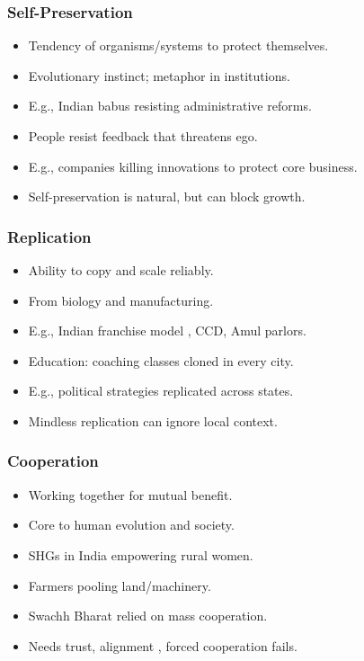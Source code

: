 \begin{frame}[fragile]\frametitle{Self-Preservation}
  \begin{itemize}
    \item Tendency of organisms/systems to protect themselves.
    \item Evolutionary instinct; metaphor in institutions.
    \item E.g., Indian babus resisting administrative reforms.
    \item People resist feedback that threatens ego.
    \item E.g., companies killing innovations to protect core business.
    \item Self-preservation is natural, but can block growth.
  \end{itemize}
\end{frame}

\begin{frame}[fragile]\frametitle{Replication}
  \begin{itemize}
    \item Ability to copy and scale reliably.
    \item From biology and manufacturing.
    \item E.g., Indian franchise model , CCD, Amul parlors.
    \item Education: coaching classes cloned in every city.
    \item E.g., political strategies replicated across states.
    \item Mindless replication can ignore local context.
  \end{itemize}
\end{frame}

\begin{frame}[fragile]\frametitle{Cooperation}
  \begin{itemize}
    \item Working together for mutual benefit.
    \item Core to human evolution and society.
    \item SHGs in India empowering rural women.
    \item Farmers pooling land/machinery.
    \item Swachh Bharat relied on mass cooperation.
    \item Needs trust, alignment , forced cooperation fails.
  \end{itemize}
\end{frame}

